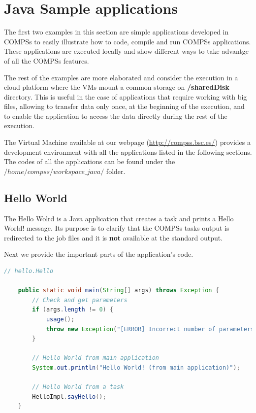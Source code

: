 \section{Java Sample applications}
\label{sec:JavaSampleApps}

The first two examples in this section are simple applications developed in COMPSs to easily illustrate how to code,
compile and run COMPSs applications. These applications are executed locally and show different ways to take advantge
of all the COMPSs features. 

The rest of the examples are more elaborated and consider the execution in a cloud platform where the VMs mount a common 
storage on \textbf{/sharedDisk} directory. This is useful in the case of applications that require working 
with big files, allowing to transfer data only once, at the beginning of the execution, and to enable 
the application to access the data directly during the rest of the execution.

The Virtual Machine available at our webpage (\url{http://compss.bsc.es/}) provides a development environment with
all the applications listed in the following sections. The codes of all the applications can be found under the 
$/home/compss/workspace\_java/$ folder. 

\subsection{Hello World}
The Hello Wolrd is a Java application that creates a task and prints a Hello World! message. Its purpose is to clarify that the COMPSs tasks output is
redirected to the job files and it is \textbf{not} available at the standard output. 

Next we provide the important parts of the application's code.

\begin{lstlisting}[language=java]
	// hello.Hello
	
	public static void main(String[] args) throws Exception {
		// Check and get parameters
		if (args.length != 0) {
			usage();
			throw new Exception("[ERROR] Incorrect number of parameters");
		}
		
		// Hello World from main application
		System.out.println("Hello World! (from main application)");

		// Hello World from a task
		HelloImpl.sayHello();
	}
\end{lstlisting}

